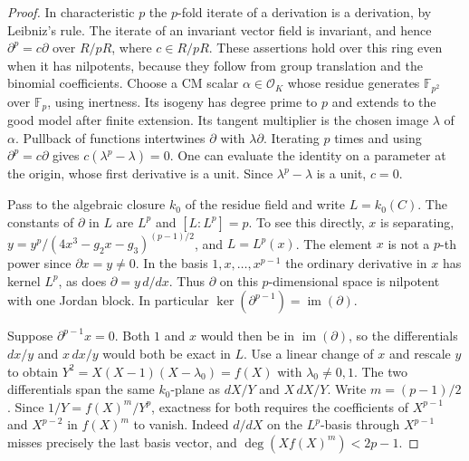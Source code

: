 \documentclass[a4paper,11pt]{article}
\theoremstyle{definition}
\theoremstyle{remark}
\numberwithin{equation}{section}
\begin{document}
\begin{proof}
In characteristic \(p\) the \(p\)-fold iterate of a derivation is
a derivation, by Leibniz's rule. The iterate of an invariant vector
field is invariant, and hence \(\partial^p=c\partial\) over
\(R/pR\), where \(c\in R/pR\). These assertions hold over this
ring even when it has nilpotents, because they follow from group
translation and the binomial coefficients. Choose a CM scalar
\(\alpha\in\mathcal O_K\) whose residue generates
\(\mathbb F_{p^2}\) over \(\mathbb F_p\), using inertness.
Its isogeny has degree prime to \(p\) and extends to the good
model after finite extension. Its tangent multiplier is the
chosen image \(\lambda\) of \(\alpha\). Pullback of functions
intertwines \(\partial\) with \(\lambda\partial\).
Iterating \(p\) times and using \(\partial^p=c\partial\)
gives \(c(\lambda^p-\lambda)=0\). One can evaluate the identity
on a parameter at the origin, whose first derivative is a unit.
Since \(\lambda^p-\lambda\) is a unit, \(c=0\).

Pass to the algebraic closure \(k_0\) of the residue field and
write \(L=k_0(C)\). The constants of \(\partial\) in \(L\)
are \(L^p\) and \([L:L^p]=p\). To see this directly, \(x\) is
separating, \(y=y^p/(4x^3-g_2x-g_3)^{(p-1)/2}\), and
\(L=L^p(x)\). The element \(x\) is not a \(p\)-th power since
\(\partial x=y\ne0\). In the basis \(1,x,\ldots,x^{p-1}\)
the ordinary derivative in \(x\) has kernel \(L^p\), as does
\(\partial=y\,d/dx\). Thus \(\partial\) on this \(p\)-dimensional
space is nilpotent with one Jordan block. In particular
\(\ker(\partial^{p-1})=\operatorname{im}(\partial)\).

Suppose \(\partial^{p-1}x=0\). Both \(1\) and \(x\) would then
be in \(\operatorname{im}(\partial)\), so the differentials
\(dx/y\) and \(x\,dx/y\) would both be exact in \(L\).
Use a linear change of \(x\) and rescale \(y\) to obtain
\(Y^2=X(X-1)(X-\lambda_0)=f(X)\) with \(\lambda_0\ne0,1\).
The two differentials span the same \(k_0\)-plane as
\(dX/Y\) and \(X\,dX/Y\). Write \(m=(p-1)/2\). Since
\(1/Y=f(X)^m/Y^p\), exactness for both requires the
coefficients of \(X^{p-1}\) and \(X^{p-2}\) in \(f(X)^m\)
to vanish. Indeed \(d/dX\) on the \(L^p\)-basis through
\(X^{p-1}\) misses precisely the last basis vector, and
\(\deg(X f(X)^m)<2p-1\).


\end{proof}
\end{document}
